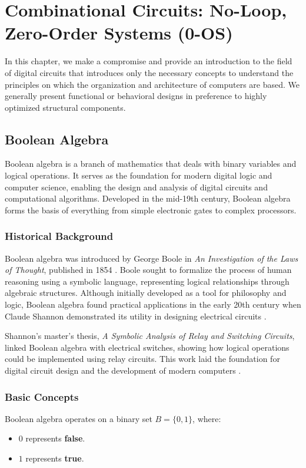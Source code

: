 \chapter{Combinational Circuits:  No-Loop, Zero-Order Systems (0-OS)}\label{lect1}
\localtoc

In this chapter, we make a compromise and provide an introduction to the field of digital circuits that introduces only the necessary concepts to understand the principles on which the organization and architecture of computers are based. We generally present functional or behavioral designs in preference to highly optimized structural components.

\section{Boolean Algebra}
Boolean algebra is a branch of mathematics that deals with binary variables and logical operations. It serves as the foundation for modern digital logic and computer science, enabling the design and analysis of digital circuits and computational algorithms. Developed in the mid-19th century, Boolean algebra forms the basis of everything from simple electronic gates to complex processors.

\subsection{Historical Background}
Boolean algebra was introduced by George Boole in \emph{An Investigation of the Laws of Thought}, published in 1854 \cite{boole1854book}. Boole sought to formalize the process of human reasoning using a symbolic language, representing logical relationships through algebraic structures. Although initially developed as a tool for philosophy and logic, Boolean algebra found practical applications in the early 20th century when Claude Shannon demonstrated its utility in designing electrical circuits \cite{shannon38}.

Shannon's master's thesis, \emph{A Symbolic Analysis of Relay and Switching Circuits}, linked Boolean algebra with electrical switches, showing how logical operations could be implemented using relay circuits. This work laid the foundation for digital circuit design and the development of modern computers \cite{shannon38}.

\subsection{Basic Concepts}
Boolean algebra operates on a binary set \( B = \{0, 1\} \), where:
\begin{itemize}
    \item \( 0 \) represents \textbf{false}.
    \item \( 1 \) represents \textbf{true}.
\end{itemize}

